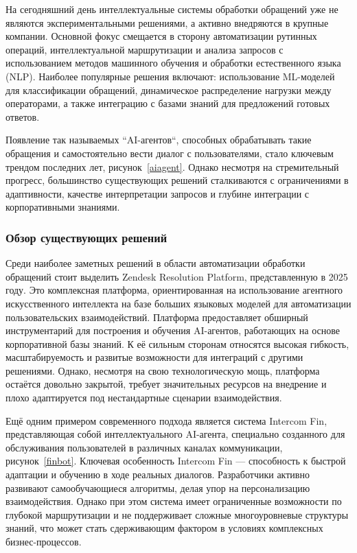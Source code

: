 На сегодняшний день интеллектуальные системы обработки обращений уже не являются экспериментальными решениями, а активно внедряются в крупные компании. Основной фокус смещается в сторону автоматизации рутинных операций, интеллектуальной маршрутизации и анализа запросов с использованием методов машинного обучения и обработки естественного языка (NLP). Наиболее популярные решения включают: использование ML-моделей для классификации обращений, динамическое распределение нагрузки между операторами, а также интеграцию с базами знаний для предложений готовых ответов.


Появление так называемых ``AI-агентов``, способных обрабатывать такие обращения и самостоятельно вести диалог с пользователями, стало ключевым трендом последних лет, рисунок~\ref{aiagent}. Однако несмотря на стремительный прогресс, большинство существующих решений сталкиваются с ограничениями в адаптивности, качестве интерпретации запросов и глубине интеграции с корпоративными знаниями.


\subsubsection{Обзор существующих решений}

Среди наиболее заметных решений в области автоматизации обработки обращений стоит выделить Zendesk Resolution Platform\cite{Zendesk}, представленную в 2025 году. Это комплексная платформа, ориентированная на использование агентного искусственного интеллекта на базе больших языковых моделей для автоматизации пользовательских взаимодействий. Платформа предоставляет обширный инструментарий для построения и обучения AI-агентов, работающих на основе корпоративной базы знаний. К её сильным сторонам относятся высокая гибкость, масштабируемость и развитые возможности для интеграций с другими решениями. Однако, несмотря на свою технологическую мощь, платформа остаётся довольно закрытой, требует значительных ресурсов на внедрение и плохо адаптируется под нестандартные сценарии взаимодействия.


Ещё одним примером современного подхода является система Intercom Fin, представляющая собой интеллектуального AI-агента, специально созданного для обслуживания пользователей в различных каналах коммуникации, рисунок~\ref{finbot}. Ключевая особенность Intercom Fin — способность к быстрой адаптации и обучению в ходе реальных диалогов. Разработчики активно развивают самообучающиеся алгоритмы, делая упор на персонализацию взаимодействия. Однако при этом система имеет ограниченные возможности по глубокой маршрутизации и не поддерживает сложные многоуровневые структуры знаний, что может стать сдерживающим фактором в условиях комплексных бизнес-процессов.

